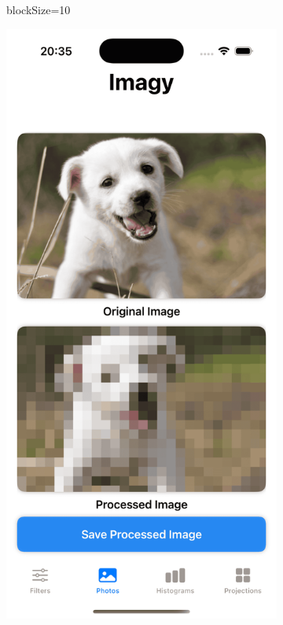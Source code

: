 \documentclass[a4paper]{article}
\begin{document}
\begin{figure}[H]
\begin{subfigure}{0.2\textwidth}
        \caption{blockSize=10}
        \label{fig:dog_mosaic_10}
    \end{subfigure}
    \hfill
    \begin{subfigure}{0.2\textwidth}
        \centering
        \includegraphics[width=\linewidth]{images/dog_mosaic_15.png}

\end{subfigure}
\end{figure}
\end{document}

